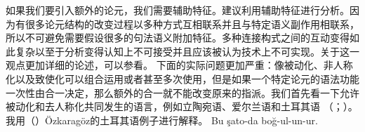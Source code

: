 \noindent
如果我们要引入额外的论元，我们需要辅助特征。\citet{Koenig99a}建议利用辅助特征进行分析。因为有很多论元结构的改变过程以多种方式互相联系并且与特定语义副作用相联系，所以不可避免需要假设很多的句法语义附加特征。多种连接构式之间的互动变得如此复杂以至于分析变得认知上不可接受并且应该被认为技术上不可实现。关于这一观点更加详细的论述，可以参看。
下面的实际问题更加严重：像被动化、非人称化以及致使化可以组合运用或者甚至多次使用，但是如果一个特定论元的语法功能一次性由合一决定，那么额外的合一就不能改变原来的指派。我们首先看一下允许被动化和去人称化共同发生的语言，例如立陶宛语\citep[\S~5]{Timberlake82a}、爱尔兰语\citep{Noonan94a}和土耳其语 （\citealp{Ozkaragoez86a}；\citealp[\S~2.3.3]{Knecht85a-u}）。我用（）Özkaragöz的土耳其语例子进行解释\citeyearpar[]{Ozkaragoez86a}。
\eal\label{ex-double-passivization}
\ex\label{ex-double-passivization-strangle}
\gll Bu şato-da boğ-ul-un-ur.\\

